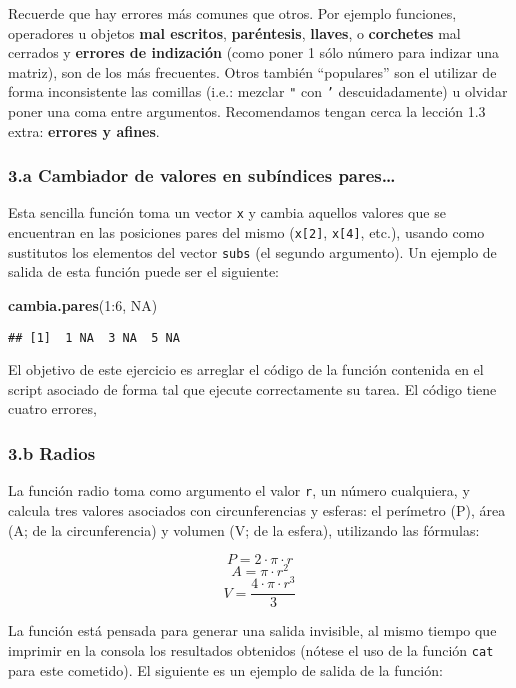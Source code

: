 \documentclass[]{article}
\newenvironment{Shaded}{}{}
\newcommand{\KeywordTok}[1]{\textcolor[rgb]{0.00,0.44,0.13}{\textbf{{#1}}}}
\newcommand{\DecValTok}[1]{\textcolor[rgb]{0.25,0.63,0.44}{{#1}}}
\newcommand{\OtherTok}[1]{\textcolor[rgb]{0.00,0.44,0.13}{{#1}}}
\newcommand{\NormalTok}[1]{{#1}}
\begin{document}
Recuerde que hay errores más comunes que otros. Por ejemplo funciones,
operadores u objetos \textbf{mal escritos}, \textbf{paréntesis},
\textbf{llaves}, o \textbf{corchetes} mal cerrados y \textbf{errores de
indización} (como poner 1 sólo número para indizar una matriz), son de
los más frecuentes. Otros también ``populares'' son el utilizar de forma
inconsistente las comillas (i.e.: mezclar \texttt{"} con \texttt{'}
descuidadamente) u olvidar poner una coma entre argumentos. Recomendamos
tengan cerca la lección 1.3 extra: \textbf{errores y afines}.

\subsubsection{3.a Cambiador de valores en subíndices pares\ldots{}}

Esta sencilla función toma un vector \texttt{x} y cambia aquellos
valores que se encuentran en las posiciones pares del mismo
(\texttt{x{[}2{]}}, \texttt{x{[}4{]}}, etc.), usando como sustitutos los
elementos del vector \texttt{subs} (el segundo argumento). Un ejemplo de
salida de esta función puede ser el siguiente:

\begin{Shaded}
\begin{Highlighting}[]
\KeywordTok{cambia.pares}\NormalTok{(}\DecValTok{1}\NormalTok{:}\DecValTok{6}\NormalTok{, }\OtherTok{NA}\NormalTok{)}
\end{Highlighting}
\end{Shaded}
\begin{verbatim}
## [1]  1 NA  3 NA  5 NA
\end{verbatim}
El objetivo de este ejercicio es arreglar el código de la función
contenida en el script asociado de forma tal que ejecute correctamente
su tarea. El código tiene cuatro errores,

\subsubsection{3.b Radios}

La función radio toma como argumento el valor \texttt{r}, un número
cualquiera, y calcula tres valores asociados con circunferencias y
esferas: el perímetro (P), área (A; de la circunferencia) y volumen (V;
de la esfera), utilizando las fórmulas:

\[
  P = 2 \cdot \pi \cdot r
\] \[
  A = \pi \cdot r^2
\] \[
  V = \frac{4 \cdot \pi \cdot r^3}{3}
\]

La función está pensada para generar una salida invisible, al mismo
tiempo que imprimir en la consola los resultados obtenidos (nótese el
uso de la función \texttt{cat} para este cometido). El siguiente es un
ejemplo de salida de la función:
\end{document}
